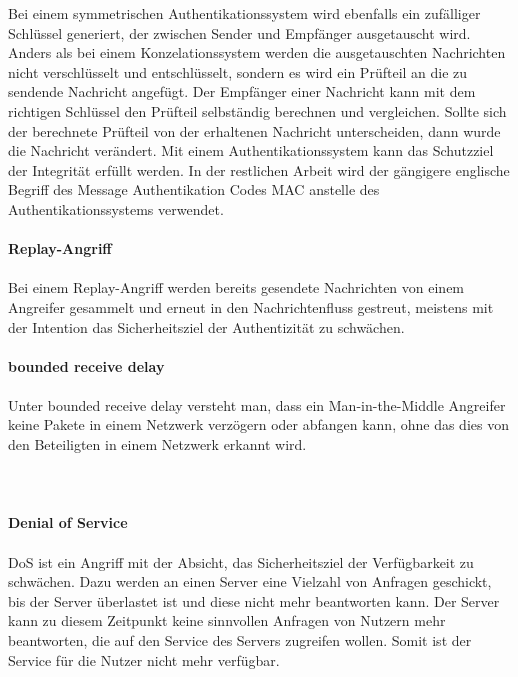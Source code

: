 Bei einem symmetrischen Authentikationssystem wird ebenfalls ein zufälliger Schlüssel generiert, der zwischen Sender und Empfänger ausgetauscht wird. Anders als bei einem Konzelationssystem werden die ausgetauschten Nachrichten nicht verschlüsselt und entschlüsselt, sondern es wird ein Prüfteil an die zu sendende Nachricht angefügt. Der Empfänger einer Nachricht kann mit dem richtigen Schlüssel den Prüfteil selbständig berechnen und vergleichen. Sollte sich der berechnete Prüfteil von der erhaltenen Nachricht unterscheiden, dann wurde die Nachricht verändert. Mit einem Authentikationssystem kann das Schutzziel der Integrität erfüllt werden. In der restlichen Arbeit wird der gängigere englische Begriff des Message Authentikation Codes \gls{MAC} anstelle des Authentikationssystems verwendet.\\
\\
\textbf{Replay-Angriff}\\
\\ 
Bei einem Replay-Angriff werden bereits gesendete Nachrichten von einem Angreifer gesammelt und erneut in den Nachrichtenfluss gestreut, meistens mit der Intention das Sicherheitsziel der Authentizität zu schwächen. \\  
\\
\textbf{bounded receive delay}\\
\\
Unter bounded receive delay versteht man, dass ein Man-in-the-Middle Angreifer keine Pakete in einem Netzwerk verzögern oder abfangen kann, ohne das dies von den Beteiligten in einem Netzwerk erkannt wird.
\\
\\
\\
\\
\textbf{Denial of Service}\\
\\
\gls{DoS} ist ein Angriff mit der Absicht, das Sicherheitsziel der Verfügbarkeit zu schwächen. Dazu werden an einen Server eine Vielzahl von Anfragen geschickt, bis der Server überlastet ist und diese nicht mehr beantworten kann. Der Server kann zu diesem Zeitpunkt keine sinnvollen Anfragen von Nutzern mehr beantworten, die auf den Service des Servers zugreifen wollen. Somit ist der Service für die Nutzer nicht mehr verfügbar.
